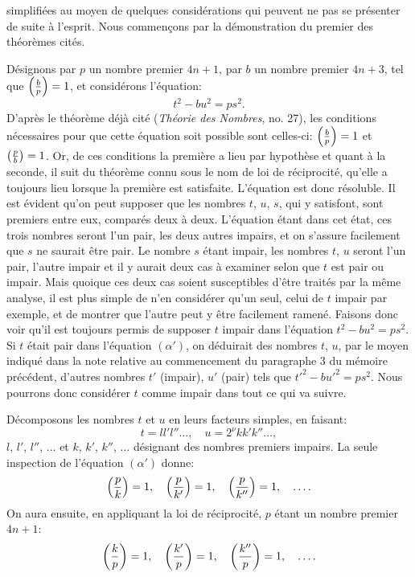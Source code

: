\noindent
simplifiées au moyen de quelques considérations qui peuvent ne pas se
présenter de suite à l'esprit. Nous commençons par la démonstration du premier
des théorèmes cités.
\par\indent
Désignons par $p$ un nombre premier $4n+1$, par $b$ un nombre premier
$4n+3$, tel que $\left(\frac{b}{p}\right)=1$, et considérons l'équation:
\begin{equation*}\tag{$\alpha'$}
t^2-bu^2=ps^2.
\end{equation*}
D'après le théorème déjà cité (\emph{Théorie des Nombres}, no. 27), les conditions
nécessaires pour que cette équation soit possible sont celles-ci: $\left(\frac{b}{p}\right)=1$ et
$\left(\frac{p}{b}\right)=1$. Or, de ces conditions la première a lieu par hypothèse et quant
à la seconde, il suit du théorème connu sous le nom de loi de réciprocité,
qu'elle a toujours lieu lorsque la première est satisfaite. L'équation est donc
résoluble. Il est évident qu'on peut supposer que les nombres $t$, $u$, $s$, qui y
satisfont, sont premiers entre eux, comparés deux à deux. L'équation étant
dans cet état, ces trois nombres seront l'un pair, les deux autres impairs, et
on s'assure facilement que $s$ ne saurait être pair. Le nombre $s$ étant impair,
les nombres $t$, $u$ seront l'un pair, l'autre impair et il y aurait deux cas à
examiner selon que $t$ est pair ou impair. Mais quoique ces deux cas soient
susceptibles d'être traités par la même analyse, il est plus simple de n'en
considérer qu'un seul, celui de $t$ impair par exemple, et de montrer que l'autre
peut y être facilement ramené. Faisons donc voir qu'il est toujours permis de
supposer $t$ impair dans l'équation $t^2-bu^2=ps^2$. Si $t$ était pair dans
l'équation $(\alpha')$, on déduirait des nombres $t$, $u$, par le moyen indiqué dans la note
relative au commencement du paragraphe 3 du mémoire précédent, d'autres
nombres $t'$ (impair), $u'$ (pair) tels que $t'^2-bu'^2=ps^2$. Nous pourrons donc
considérer $t$ comme impair dans tout ce qui va suivre.
\par\indent
Décomposons les nombres $t$ et $u$ en leurs facteurs simples, en faisant:
\[
t=ll'l''\ldots,\quad u=2^\nu kk'k''\ldots,
\]
$l$, $l'$, $l''$, $\ldots$ et $k$, $k'$, $k''$, $\ldots$ désignant des nombres premiers impairs. La seule
inspection de l'équation $(\alpha')$ donne:
\[
\left(\frac{p}{k}\right)=1,\quad\left(\frac{p}{k'}\right)=1,\quad\left(\frac{p}{k''}\right)=1,\quad\ldots.
\]
On aura ensuite, en appliquant la loi de réciprocité, $p$ étant un nombre
premier $4n+1$:
\[
\left(\frac{k}{p}\right)=1,\quad\left(\frac{k'}{p}\right)=1,\quad\left(\frac{k''}{p}\right)=1,\quad\ldots.
\]
